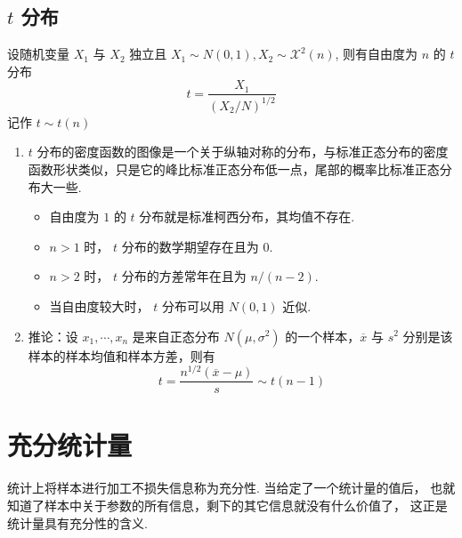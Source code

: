 \documentclass[a5paper,12pt]{article}
\begin{document}
\subsection{ $t$ 分布}
设随机变量  $X_1$ 与  $X_2$ 独立且  $X_1 \sim N(0,1), X_2 \sim \mathcal{X}^2(n)$, 则有自由度为 $n$ 的 $t$ 分布
\[
t = \frac{X_1}{(X_2/N)^{1/2}}
\]
记作  $t \sim t(n)$
\begin{enumerate}
  \item  $t$ 分布的密度函数的图像是一个关于纵轴对称的分布，与标准正态分布的密度函数形状类似，只是它的峰比标准正态分布低一点，尾部的概率比标准正态分布大一些.
  \begin{itemize}
    \item 自由度为 $1$ 的 $t$ 分布就是标准柯西分布，其均值不存在.
    \item  $n>1$ 时， $t$ 分布的数学期望存在且为 $0$.
    \item  $n>2$ 时， $t$ 分布的方差常年在且为 $n/(n-2)$.
    \item  当自由度较大时， $t$ 分布可以用  $N(0,1)$ 近似.
  \end{itemize}
  \item 推论：设  $x_1,\cdots,x_n$ 是来自正态分布  $N(\mu,\sigma^2)$ 的一个样本，$\overline{x}$ 与 $s^2$ 分别是该样本的样本均值和样本方差，则有
  \[
  t = \frac{n^{1/2} (\overline{x} - \mu)}{s} \sim t(n-1)
  \]
\end{enumerate}



\section{充分统计量}
统计上将样本进行加工不损失信息称为充分性. 当给定了一个统计量的值后，
也就知道了样本中关于参数的所有信息，剩下的其它信息就没有什么价值了，
这正是统计量具有充分性的含义.
\end{document}
